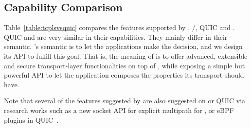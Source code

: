 \subsection{Capability Comparison}

Table~\ref{table:tcplsvsquic} compares the features supported by
\tcp, \tls/\tcp, QUIC and \tcpls. QUIC and \tcpls are very similar in their
capabilities. They mainly differ in their semantic. \tcpls's semantic is to let
the applications make the decision, and we design its API to fulfill this goal.
That is, the meaning of \tcpls is to offer advanced, extensible and secure
transport-layer functionalities on top of \tcp, while exposing a simple but
powerful API to let the application composes the properties its transport should
have.

Note that several of the features suggested by \tcpls are also suggested on \tcp or
QUIC via research works such as a new socket API for explicit multipath for
\tcp\cite{hesmans2016enhanced}, or eBPF plugins in
QUIC~\cite{de2019pluginizing}.

